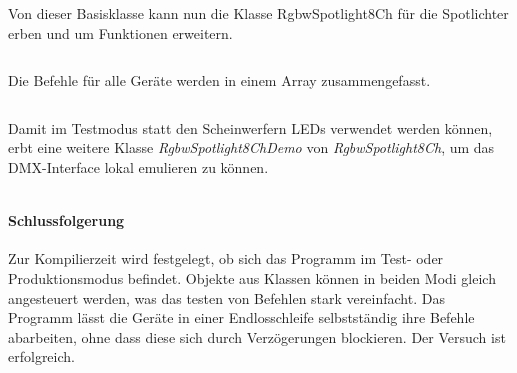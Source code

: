 Von dieser Basisklasse kann nun die Klasse RgbwSpotlight8Ch für die Spotlichter erben und um Funktionen erweitern.
\inputminted[linenos=true, breaklines, fontsize=\fontsize{10pt}{10pt}]{cpp}{../src/RgbwSpotlight8Ch.h}

Die Befehle für alle Geräte werden in einem Array zusammengefasst.
\inputminted[linenos=true, breaklines, fontsize=\fontsize{10pt}{10pt}]{cpp}{../src/CommandList.h}

Damit im Testmodus statt den Scheinwerfern LEDs verwendet werden können, erbt eine weitere Klasse \textit{RgbwSpotlight8ChDemo} von \textit{RgbwSpotlight8Ch}, um das DMX-Interface lokal emulieren zu können.
\inputminted[linenos=true, breaklines, fontsize=\fontsize{10pt}{10pt}]{cpp}{../src/RgbwSpotlight8ChDemo.h}

\paragraph{Schlussfolgerung}
Zur Kompilierzeit wird festgelegt, ob sich das Programm im Test- oder Produktionsmodus befindet. Objekte aus Klassen können in beiden Modi gleich angesteuert werden, was das testen von Befehlen stark vereinfacht. Das Programm lässt die Geräte in einer Endlosschleife selbstständig ihre Befehle abarbeiten, ohne dass diese sich durch Verzögerungen blockieren. Der Versuch ist erfolgreich.
